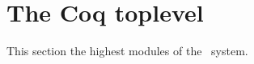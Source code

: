 
\section*{The Coq toplevel}

\ocwsection \label{toplevel}
This section the highest modules of the \Coq\ system.
